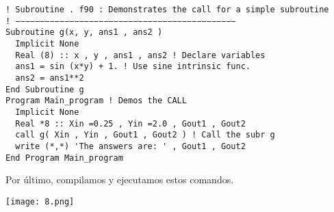 \documentclass[12pt]{article}
\begin{document}
\begin{verbatim}
! Subroutine . f90 : Demonstrates the call for a simple subroutine
! −−−−−−−−−−−−−−−−−−−−−−−−−−−−−−−−−−−−−−−−−−−−−
Subroutine g(x, y, ans1 , ans2 )
  Implicit None
  Real (8) :: x , y , ans1 , ans2 ! Declare variables
  ans1 = sin (x*y) + 1. ! Use sine intrinsic func.
  ans2 = ans1**2
End Subroutine g
Program Main_program ! Demos the CALL
  Implicit None
  Real *8 :: Xin =0.25 , Yin =2.0 , Gout1 , Gout2
  call g( Xin , Yin , Gout1 , Gout2 ) ! Call the subr g
  write (*,*) 'The answers are: ' , Gout1 , Gout2
End Program Main_program 
\end{verbatim}

Por último, compilamos y ejecutamos estos comandos.

\begin{center}
\texttt{[image: 8.png]}\\
\end{center}


\end{document}
